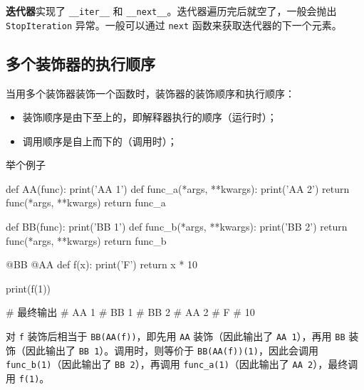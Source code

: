 \textbf{迭代器}实现了 \texttt{__iter__} 和 \texttt{__next__}。迭代器遍历完后就空了，一般会抛出 \texttt{StopIteration} 异常。一般可以通过 \texttt{next} 函数来获取迭代器的下一个元素。

\subsection{多个装饰器的执行顺序}
当用多个装饰器装饰一个函数时，装饰器的装饰顺序和执行顺序：
\begin{itemize}
	\item 装饰顺序是由下至上的，即解释器执行的顺序（运行时）；
	
	\item 调用顺序是自上而下的（调用时）；
\end{itemize}
举个例子
\begin{python}
	def AA(func):
		print('AA 1')
		def func_a(*args, **kwargs):
			print('AA 2')
			return func(*args, **kwargs)
		return func_a
	
	def BB(func):
		print('BB 1')
		def func_b(*args, **kwargs):
			print('BB 2')
			return func(*args, **kwargs)
		return func_b
	
	@BB
	@AA
	def f(x):
		print('F')
		return x * 10
	
	print(f(1))
	
	# 最终输出
	# AA 1
	# BB 1
	# BB 2
	# AA 2
	# F
	# 10
\end{python}

对 \texttt{f} 装饰后相当于 \texttt{BB(AA(f))}，即先用 \texttt{AA} 装饰（因此输出了 \texttt{AA 1}），再用 \texttt{BB} 装饰（因此输出了 \texttt{BB 1}）。调用时，则等价于 \texttt{BB(AA(f))(1)}，因此会调用 \texttt{func_b(1)}（因此输出了 \texttt{BB 2}），再调用 \texttt{func_a(1)}（因此输出了 \texttt{AA 2}），最终调用 \texttt{f(1)}。